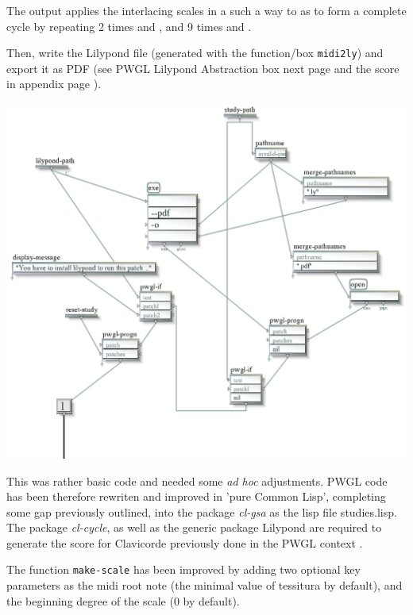 \smallskip

The output \textcolor{gray}{} applies the interlacing scales in a such a way to as to form a complete cycle by repeating 2 times \textcolor{gray}{} and \textcolor{gray}{}, and 9 times \textcolor{gray}{} and \textcolor{gray}{}.  

\bigskip

Then, \textcolor{gray}{} write the Lilypond file (generated with the function/box \texttt{midi2ly}) and export it as PDF (see PWGL Lilypond Abstraction box next page and the score in appendix page \pageref{clav}).

{
\begin{center}
\includegraphics[width=\textwidth]{mp/img/lilypond-abs}
\end{center}
\vspace{-6mm}
} 

This was rather basic code and needed some \textit{ad hoc }adjustments. PWGL code has been therefore rewriten and improved in 'pure Common Lisp', completing some gap previously outlined, into the package \textit{cl-gsa} as the lisp file \textsf{studies.lisp}. The package \textit{cl-cycle}, as well as the generic package Lilypond are required to generate the score for Clavicorde previously done in the PWGL context .

\bigskip
The function \texttt{make-scale} has been improved by adding two optional key parameters as the midi root note (the minimal value of tessitura by default), and the beginning degree of the scale (0 by default).

